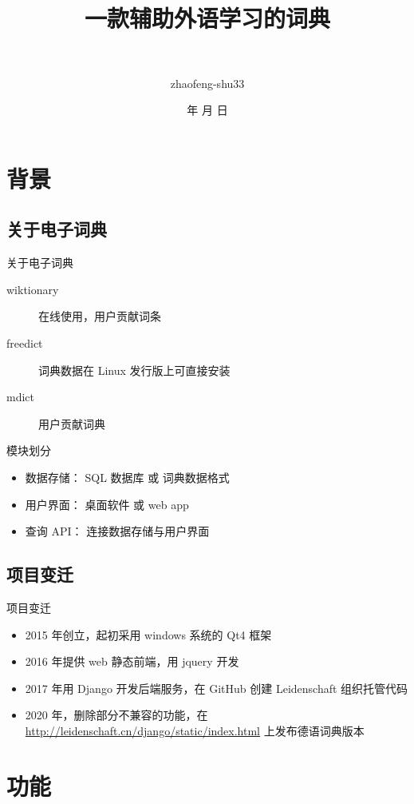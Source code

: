 \documentclass[notheorems,xetex]{beamer}
\title{一款辅助外语学习的词典} %
\author[赵丰]
{\quad {赵丰}\\ \and {zhaofeng-shu33}}
\institute[清华大学] %
{\normalsize\quad
  2020中文学生开源年会
}
\date{\the\year 年 \the\month 月 \the\day 日}
\begin{document}
\frame{\titlepage}
\frame{\tableofcontents}
\section{背景}
\subsection{关于电子词典}
\begin{frame}{关于电子词典}
\begin{description}
	\item[wiktionary] 在线使用，用户贡献词条
	\item[freedict]	词典数据在 Linux 发行版上可直接安装
	\item[mdict] 用户贡献词典
\end{description}
\begin{block}{模块划分}
	\begin{itemize}
		\item 数据存储： SQL 数据库 或 词典数据格式
		\item 用户界面： 桌面软件 或 web app
		\item 查询 API： 连接数据存储与用户界面
	\end{itemize}
\end{block}
\end{frame}

\subsection{项目变迁}
\begin{frame}{项目变迁}
\begin{itemize}
	\item 2015 年创立，起初采用 windows 系统的 Qt4 框架
	\item 2016 年提供 web 静态前端，用 jquery 开发
	\item 2017 年用 Django 开发后端服务，在 GitHub 创建 Leidenschaft 组织托管代码
	\item 2020 年，删除部分不兼容的功能，在 \url{http://leidenschaft.cn/django/static/index.html} 上发布德语词典版本
\end{itemize}
\end{frame}
\section{功能}
\frame{\tableofcontents[currentsection]}
\end{document}
